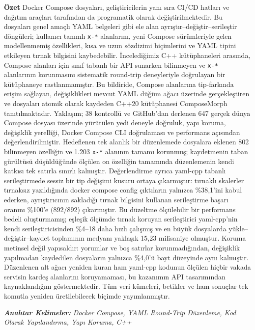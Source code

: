 \documentclass[12pt,a4paper]{article}
\begin{document}
\noindent\textbf{Özet} Docker Compose dosyaları, geliştiricilerin yanı sıra CI/CD hatları ve dağıtım araçları tarafından da programatik olarak değiştirilmektedir. Bu dosyaları genel amaçlı YAML belgeleri gibi ele alan ayrıştır--değiştir--serileştir döngüleri; kullanıcı tanımlı \texttt{x-*} alanlarını, yeni Compose sürümleriyle gelen modellenmemiş özellikleri, kısa ve uzun sözdizimi biçimlerini ve YAML tipini etkileyen tırnak bilgisini kaybedebilir. İncelediğimiz C++ kütüphaneleri arasında, Compose alanları için sınıf tabanlı bir API sunarken bilinmeyen ve \texttt{x-*} alanlarının korunmasını sistematik round-trip deneyleriyle doğrulayan bir kütüphaneye rastlanmamıştır. Bu bildiride, Compose alanlarına tip-farkında erişim sağlayan, değişiklikleri mevcut YAML düğüm ağacı üzerinde gerçekleştiren ve dosyaları atomik olarak kaydeden C++20 kütüphanesi ComposeMorph tanıtılmaktadır. Yaklaşım; 38 kontrollü ve GitHub'dan derlenen 647 gerçek dünya Compose dosyası üzerinde yürütülen yedi deneyle doğruluk, yapı koruma, değişiklik yerelliği, Docker Compose CLI doğrulaması ve performans açısından değerlendirilmiştir. Hedeflenen tek alanlık bir düzenlemede dosyalara eklenen 802 bilinmeyen özelliğin ve 1.203 \texttt{x-*} alanının tamamı korunmuş; kaydetmenin taban gürültüsü düşüldüğünde ölçülen on özelliğin tamamında düzenlemenin kendi katkısı tek satırla sınırlı kalmıştır. Değerlendirme ayrıca yaml-cpp tabanlı serileştirmede sessiz bir tip değişimi kusuru ortaya çıkarmıştır: tırnaklı skalerler tırnaksız yazıldığında docker compose config çıktıların yalnızca \%38,1'ini kabul ederken, ayrıştırıcının sakladığı tırnak bilgisini kullanan serileştirme başarı oranını \%100'e (892/892) çıkarmıştır. Bu düzeltme ölçülebilir bir performans bedeli oluşturmamış; eşleşik ölçümde tırnak koruyan serileştirici yaml-cpp'nin kendi serileştiricisinden \%4--18 daha hızlı çalışmış ve en büyük dosyalarda yükle--değiştir--kaydet toplamının medyanı yaklaşık 15,23 milisaniye olmuştur. Koruma metinsel değil yapısaldır: yorumlar ve boş satırlar korunmadığından, değişiklik yapılmadan kaydedilen dosyaların yalnızca \%4,0'ü bayt düzeyinde aynı kalmıştır. Düzenlenen alt ağacı yeniden kuran ham yaml-cpp kodunun ölçülen hiçbir vakada servisin kardeş alanlarını koruyamaması, bu kazanımın API tasarımından kaynaklandığını göstermektedir. Tüm veri kümeleri, betikler ve ham sonuçlar tek komutla yeniden üretilebilecek biçimde yayımlanmıştır.

\smallskip\noindent\textbf{\textit{Anahtar Kelimeler:}} \textit{Docker Compose, YAML Round-Trip Düzenleme, Kod Olarak Yapılandırma, Yapı Koruma, C++}
\end{document}
